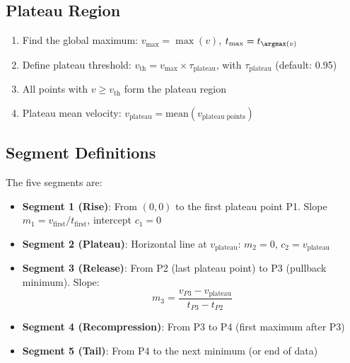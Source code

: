 \subsection{Plateau Region}
\begin{enumerate}
    \item Find the global maximum: $v_{\max} = \max(v)$, $t_{\max} = t_{\argmax(v)}$
    \item Define plateau threshold: $v_{\text{th}} = v_{\max} \times \tau_{\text{plateau}}$, with $\tau_{\text{plateau}}$ (default: 0.95)
    \item All points with $v \geq v_{\text{th}}$ form the plateau region
    \item Plateau mean velocity: $v_{\text{plateau}} = \text{mean}(v_{\text{plateau points}})$
\end{enumerate}

\subsection{Segment Definitions}
The five segments are:
\begin{itemize}
    \item \textbf{Segment 1 (Rise)}: From $(0, 0)$ to the first plateau point P1. Slope $m_1 = v_{\text{first}} / t_{\text{first}}$, intercept $c_1 = 0$
    \item \textbf{Segment 2 (Plateau)}: Horizontal line at $v_{\text{plateau}}$: $m_2 = 0$, $c_2 = v_{\text{plateau}}$
    \item \textbf{Segment 3 (Release)}: From P2 (last plateau point) to P3 (pullback minimum). Slope:
    \begin{equation}
    m_3 = \frac{v_{P3} - v_{\text{plateau}}}{t_{P3} - t_{P2}}
    \end{equation}
    \item \textbf{Segment 4 (Recompression)}: From P3 to P4 (first maximum after P3)
    \item \textbf{Segment 5 (Tail)}: From P4 to the next minimum (or end of data)
\end{itemize}


